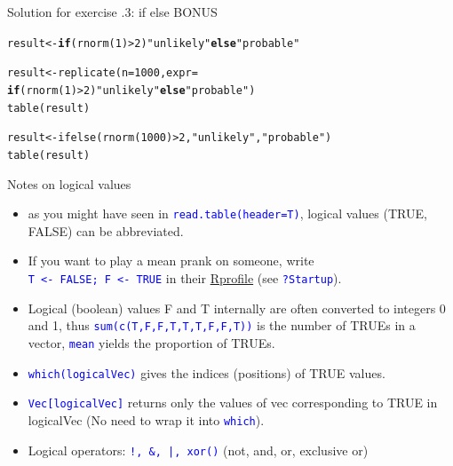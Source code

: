 \documentclass[xcolor=table,       handout,    xcolor=dvipsnames]{beamer}\usepackage[]{graphicx}\usepackage[]{color}
\makeatletter
\newcommand{\hlnum}[1]{\textcolor[rgb]{0,0,0}{#1}}
\newcommand{\hlstr}[1]{\textcolor[rgb]{0.545,0.137,0.137}{#1}}
\newcommand{\hlopt}[1]{\textcolor[rgb]{0,0,0}{#1}}
\newcommand{\hlstd}[1]{\textcolor[rgb]{0,0,0}{#1}}
\newcommand{\hlkwa}[1]{\textcolor[rgb]{1,0,0}{\textbf{#1}}}
\newcommand{\hlkwb}[1]{\textcolor[rgb]{0,0,0}{#1}}
\newcommand{\hlkwc}[1]{\textcolor[rgb]{1,0,1}{#1}}
\newcommand{\hlkwd}[1]{\textcolor[rgb]{0,0,1}{#1}}
\newenvironment{kframe}{%
 \def\at@end@of@kframe{}%
 \ifinner\ifhmode%
  \def\at@end@of@kframe{\end{minipage}}%
  \begin{minipage}{\columnwidth}%
 \fi\fi%
 \def\FrameCommand##1{\hskip\@totalleftmargin \hskip-\fboxsep
 \colorbox{shadecolor}{##1}\hskip-\fboxsep
     \hskip-\linewidth \hskip-\@totalleftmargin \hskip\columnwidth}%
 \MakeFramed {\advance\hsize-\width
   \@totalleftmargin\z@ \linewidth\hsize
   \@setminipage}}%
 {\par\unskip\endMakeFramed%
 \at@end@of@kframe}
\newenvironment{knitrout}{}{} %
\newcounter{exercisecount}
\newcommand{\rcode}[1]{\texttt{\textcolor{Blue}{#1}}} %
\makeatother
\begin{document}

\begin{frame}[fragile]{Solution for exercise .3: if else BONUS}
\begin{knitrout}
\color{fgcolor}\begin{kframe}
\begin{alltt}
\hlstd{result} \hlkwb{<-} \hlkwa{if}\hlstd{(}\hlkwd{rnorm}\hlstd{(}\hlnum{1}\hlstd{)}\hlopt{>}\hlnum{2}\hlstd{)} \hlstr{"unlikely"} \hlkwa{else} \hlstr{"probable"}

\hlstd{result} \hlkwb{<-} \hlkwd{replicate}\hlstd{(}\hlkwc{n}\hlstd{=}\hlnum{1000}\hlstd{,} \hlkwc{expr}\hlstd{=}
             \hlkwa{if}\hlstd{(}\hlkwd{rnorm}\hlstd{(}\hlnum{1}\hlstd{)}\hlopt{>}\hlnum{2}\hlstd{)} \hlstr{"unlikely"} \hlkwa{else} \hlstr{"probable"}\hlstd{)}
\hlkwd{table}\hlstd{(result)}

\hlstd{result} \hlkwb{<-} \hlkwd{ifelse}\hlstd{(}\hlkwd{rnorm}\hlstd{(}\hlnum{1000}\hlstd{)}\hlopt{>}\hlnum{2}\hlstd{,} \hlstr{"unlikely"}\hlstd{,} \hlstr{"probable"}\hlstd{)}
\hlkwd{table}\hlstd{(result)}
\end{alltt}
\end{kframe}
\end{knitrout}
\end{frame}


\begin{frame}[fragile]{Notes on logical values}
\begin{itemize}[<+->]
\item as you might have seen in \rcode{read.table(header=T)}, logical values (TRUE, FALSE) can be abbreviated.
\item If you want to play a mean prank on someone, write\\ \rcode{T <- FALSE; F <- TRUE} in their \href{https://rclickhandbuch.wordpress.com/install-r/rprofile/}{Rprofile} (see \rcode{?Startup}).
\item Logical (boolean) values F and T internally are often converted to integers 0 and 1, thus \rcode{sum(c(T,F,F,T,T,T,F,F,T))} is the number of TRUEs in a vector, \rcode{mean} yields the proportion of TRUEs.
\item \rcode{which(logicalVec)} gives the indices (positions) of TRUE values.
\item \rcode{Vec[logicalVec]} returns only the values of vec corresponding to TRUE in logicalVec (No need to wrap it into \rcode{which}).
\item Logical operators: \rcode{!, \&, |, xor()} (not, and, or, exclusive or)
\end{itemize}
\end{frame}
\end{document}
